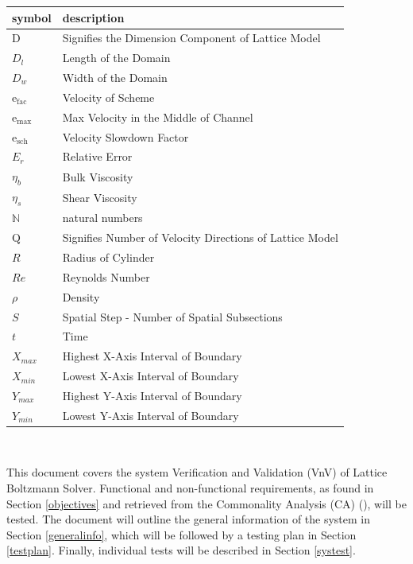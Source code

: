 \documentclass[12pt, titlepage]{article}
\newcommand{\famname}{Lattice Boltzmann Solver}
\begin{document}
\renewcommand{\arraystretch}{1.2}
\begin{tabular}{l l} 
  \toprule		
  \textbf{symbol} & \textbf{description}\\
  \midrule 
  $\mathrm{D}$ & Signifies the Dimension Component of Lattice Model\\
  $D_{l}$ & Length of the Domain\\
  $D_{w}$ & Width of the Domain\\
  $\mathrm{e_{fac}}$ & Velocity of Scheme\\
  $\mathrm{e_{max}}$ & Max Velocity in the Middle of Channel\\
  $\mathrm{e_{sch}}$ & Velocity Slowdown Factor\\
  $E_r$ & Relative Error\\
  $\eta_b$ & Bulk Viscosity \\
  $\eta_s$ & Shear Viscosity \\
  $\mathbb{N}$ & natural numbers\\
  $\mathrm{Q}$ & Signifies Number of Velocity Directions of Lattice Model\\
  $R$ & Radius of Cylinder\\
  $Re$ & Reynolds Number\\
  $\rho$ & Density \\
  $S$ & Spatial Step - Number of Spatial Subsections\\
  $t$ & Time \\
  $X_{max}$ & Highest X-Axis Interval of Boundary\\
  $X_{min}$ & Lowest X-Axis Interval of Boundary\\
  $Y_{max}$ & Highest Y-Axis Interval of Boundary\\
  $Y_{min}$ & Lowest Y-Axis Interval of Boundary\\
  \bottomrule
\end{tabular}\\

\newpage


\noindent This document covers the system Verification and Validation (VnV) of
\famname . Functional and non-functional requirements, as found in Section
\ref{objectives} and retrieved from the Commonality Analysis (CA)
(\citet{LBM_CA_PM}), will be tested. The document will outline the general
information of the system in Section \ref{generalinfo}, which will be followed
by a testing plan in Section \ref{testplan}. Finally, individual tests will be
described in Section \ref{systest}.
\end{document}
